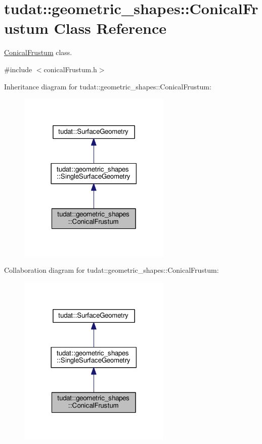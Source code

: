 \hypertarget{classtudat_1_1geometric__shapes_1_1ConicalFrustum}{}\section{tudat\+:\+:geometric\+\_\+shapes\+:\+:Conical\+Frustum Class Reference}
\label{classtudat_1_1geometric__shapes_1_1ConicalFrustum}


\hyperlink{classtudat_1_1geometric__shapes_1_1ConicalFrustum}{Conical\+Frustum} class.  




{\ttfamily \#include $<$conical\+Frustum.\+h$>$}



Inheritance diagram for tudat\+:\+:geometric\+\_\+shapes\+:\+:Conical\+Frustum\+:
\nopagebreak
\begin{figure}[H]
\begin{center}
\leavevmode
\includegraphics[width=206pt]{classtudat_1_1geometric__shapes_1_1ConicalFrustum__inherit__graph}
\end{center}
\end{figure}


Collaboration diagram for tudat\+:\+:geometric\+\_\+shapes\+:\+:Conical\+Frustum\+:
\nopagebreak
\begin{figure}[H]
\begin{center}
\leavevmode
\includegraphics[width=206pt]{classtudat_1_1geometric__shapes_1_1ConicalFrustum__coll__graph}
\end{center}
\end{figure}
